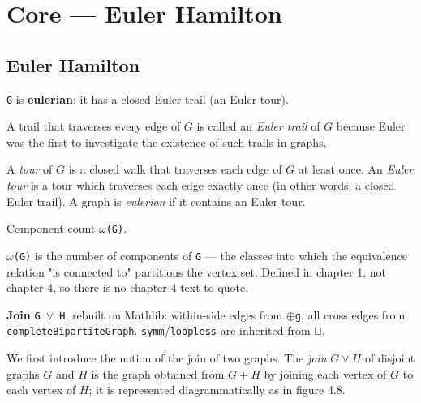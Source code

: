 \section{Core --- Euler Hamilton}
\subsection{Euler Hamilton}


\begin{definition}
\label{SimpleGraph.IsEulerianGraph}
\leanok
\texttt{G} is \textbf{eulerian}: it has a closed Euler trail (an Euler tour).

A trail that traverses every edge of $G$ is called an \emph{Euler trail} of $G$
because Euler was the first to investigate the existence of such trails in
graphs.

A \emph{tour} of $G$ is a closed walk that traverses each edge of $G$ at least once. An
\emph{Euler tour} is a tour which traverses each edge exactly once (in other words, a
closed Euler trail). A graph is \emph{eulerian} if it contains an Euler tour.
\end{definition}

\begin{definition}
\label{SimpleGraph.numComponents}
\leanok
Component count \texttt{$\omega$(G)}.

\texttt{$\omega$(G)} is the number of components of \texttt{G} --- the classes into which the equivalence relation "is connected to" partitions the vertex set. Defined in chapter 1, not chapter 4, so there is no chapter-4 text to quote.
\end{definition}

\begin{definition}[join]
\label{SimpleGraph.join}
\leanok
\textbf{Join} \texttt{G $\lor$ H}, rebuilt on Mathlib: within-side edges from
\texttt{$\oplus$g}, all cross edges from \texttt{completeBipartiteGraph}.
\texttt{symm}/\texttt{loopless} are inherited from \texttt{$\sqcup$}.

We first introduce the notion of the join of two graphs. The \emph{join} $G \vee H$ of
disjoint graphs $G$ and $H$ is the graph obtained from $G + H$ by joining each vertex of
$G$ to each vertex of $H$; it is represented diagrammatically as in figure 4.8.
\end{definition}

